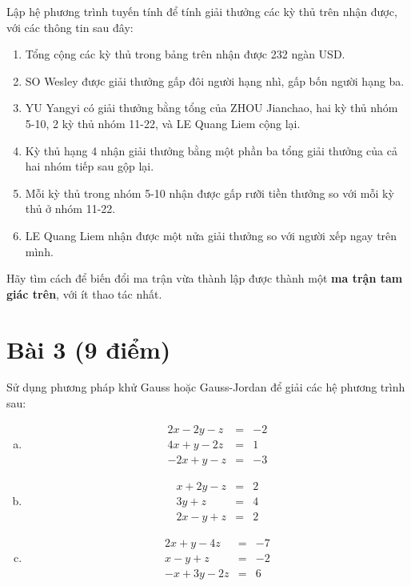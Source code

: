 \documentclass[12pt]{article}
\begin{document}
Lập hệ phương trình tuyến tính để tính giải thưởng các kỳ thủ trên nhận được, với các thông tin sau đây:
\begin{enumerate}
 \item Tổng cộng các kỳ thủ trong bảng trên nhận được 232 ngàn USD. %
 \item SO Wesley được giải thưởng gấp đôi người hạng nhì, gấp bốn người hạng ba. %
 \item YU Yangyi có giải thưởng bằng tổng của ZHOU Jianchao, hai kỳ thủ nhóm 5-10, 2 kỳ thủ nhóm 11-22, và LE Quang Liem cộng lại. %
 \item Kỳ thủ hạng 4 nhận giải thưởng bằng một phần ba tổng giải thưởng của cả hai nhóm tiếp sau gộp lại. %
 \item Mỗi kỳ thủ trong nhóm 5-10 nhận được gấp rưỡi tiền thưởng so với mỗi kỳ thủ ở nhóm 11-22. %
 \item LE Quang Liem nhận được một nửa giải thưởng so với người xếp ngay trên mình. %
\end{enumerate}

Hãy tìm cách để biến đổi ma trận vừa thành lập được thành một \textbf{ma trận tam giác trên}, với ít thao tác nhất.

\section{Bài 3 (9 điểm)}

Sử dụng phương pháp khử Gauss hoặc Gauss-Jordan để giải các hệ phương trình sau:

\begin{enumerate}[a)]
\item 
\begin{eqnarray*}
    2x -2y -z &=& -2\\
    4x + y -2z &=& 1\\
    -2x + y -z &=& -3
  \end{eqnarray*}


\item 
  \begin{eqnarray*}
    x + 2y -z &=& 2\\
       3y + z &=& 4\\
    2x -y + z &=& 2
  \end{eqnarray*}


\item 
  \begin{eqnarray*}
    2x + y -4z &=& -7\\
    x -y +z &=& -2\\
    -x + 3y - 2z &=& 6
  \end{eqnarray*}

\end{enumerate}
\end{document}
